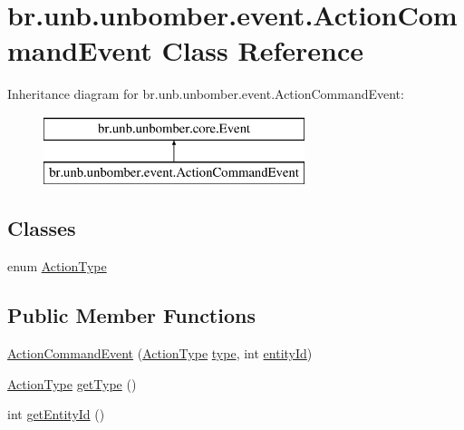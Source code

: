 \hypertarget{classbr_1_1unb_1_1unbomber_1_1event_1_1_action_command_event}{\section{br.\+unb.\+unbomber.\+event.\+Action\+Command\+Event Class Reference}
\label{classbr_1_1unb_1_1unbomber_1_1event_1_1_action_command_event}
}
Inheritance diagram for br.\+unb.\+unbomber.\+event.\+Action\+Command\+Event\+:\begin{figure}[H]
\begin{center}
\leavevmode
\includegraphics[height=2.000000cm]{classbr_1_1unb_1_1unbomber_1_1event_1_1_action_command_event}
\end{center}
\end{figure}
\subsection*{Classes}
\begin{DoxyCompactItemize}
\item 
enum \hyperlink{enumbr_1_1unb_1_1unbomber_1_1event_1_1_action_command_event_1_1_action_type}{Action\+Type}
\end{DoxyCompactItemize}
\subsection*{Public Member Functions}
\begin{DoxyCompactItemize}
\item 
\hyperlink{classbr_1_1unb_1_1unbomber_1_1event_1_1_action_command_event_ad6ed6c4e0d9c9347e4480f383c45df62}{Action\+Command\+Event} (\hyperlink{enumbr_1_1unb_1_1unbomber_1_1event_1_1_action_command_event_1_1_action_type}{Action\+Type} \hyperlink{classbr_1_1unb_1_1unbomber_1_1event_1_1_action_command_event_ae3fcdcc187420aaf77783896fb74490c}{type}, int \hyperlink{classbr_1_1unb_1_1unbomber_1_1event_1_1_action_command_event_a4f6a8d5d706273c6cd4098179dc3a7e0}{entity\+Id})
\item 
\hyperlink{enumbr_1_1unb_1_1unbomber_1_1event_1_1_action_command_event_1_1_action_type}{Action\+Type} \hyperlink{classbr_1_1unb_1_1unbomber_1_1event_1_1_action_command_event_a8597fc9a3e92327f359f6b3d9821669f}{get\+Type} ()
\item 
int \hyperlink{classbr_1_1unb_1_1unbomber_1_1event_1_1_action_command_event_a084bdde4fa87a91fa63c0e791142766b}{get\+Entity\+Id} ()
\end{DoxyCompactItemize}
